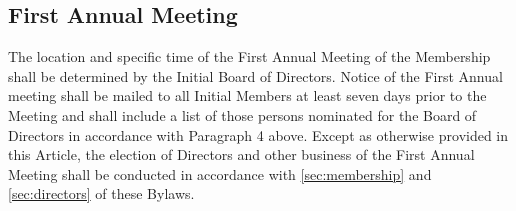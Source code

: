 \subsection{First Annual Meeting}
The location and specific time of the First Annual Meeting of the
Membership shall be determined by the Initial Board of
Directors. Notice of the First Annual meeting shall be mailed to all
Initial Members at least seven days prior to the Meeting and shall
include a list of those persons nominated for the Board of Directors
in accordance with Paragraph 4 above. Except as otherwise provided in
this Article, the election of Directors and other business of the
First Annual Meeting shall be conducted in accordance with
\ref{sec:membership} and \ref{sec:directors} of these Bylaws.

